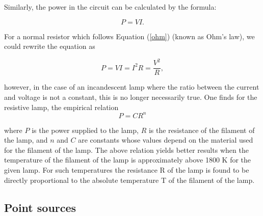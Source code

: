





Similarly, the power in the circuit can be calculated by the formula: 

\begin{equation}
    P = V I.
\end{equation}

For a normal resistor which follows Equation (\ref{ohm}) (known as Ohm's law), we could rewrite the equation as 

\begin{equation*}
    P = VI = I^2 R = \frac{V^2}{R},
\end{equation*}

however, in the case of an incandescent lamp where the ratio between the current and voltage is not a constant, this is no longer necessarily true. One finds for the resistive lamp, the empirical relation
\begin{equation*}
P = C R^n
\end{equation*}

where $P$ is the power supplied to the lamp, $R$ is the resistance of the filament of the lamp, and $n$ and $C$ are constants whose values depend on the material used for the filament of the lamp. The above relation yields better results when the temperature of the filament of the lamp is approximately above 1800 K for the given lamp. For such temperatures the resistance R of the lamp is found to be directly proportional to the absolute temperature T of the filament of the lamp.



\subsection*{Point sources}


